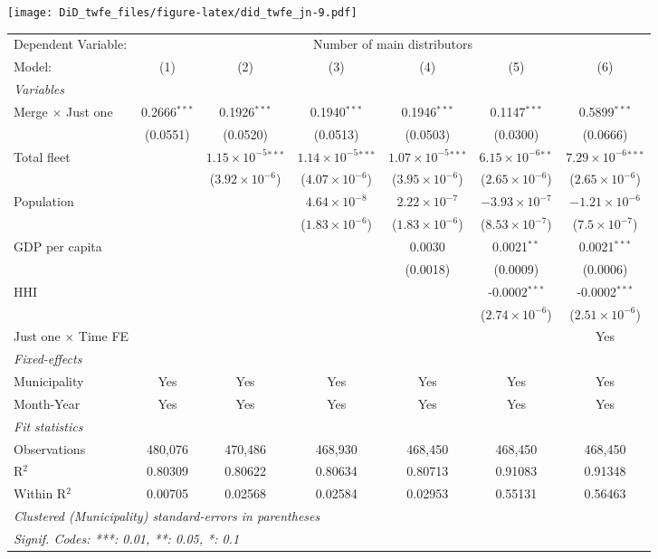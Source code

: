\documentclass[
]{article}
\begin{document}
\texttt{[image: DiD\_twfe\_files/figure-latex/did\_twfe\_jn-9.pdf]}

\begin{tabular}{lcccccc}
\tabularnewline\midrule\midrule
Dependent Variable:&\multicolumn{6}{c}{Number of main distributors}\\
Model:&(1) & (2) & (3) & (4) & (5) & (6)\\
\midrule \emph{Variables}&   &   &   &   &   &  \\
Merge $\times $ Just one & 0.2666$^{***}$ & 0.1926$^{***}$ & 0.1940$^{***}$ & 0.1946$^{***}$ & 0.1147$^{***}$ & 0.5899$^{***}$\\
  &(0.0551) & (0.0520) & (0.0513) & (0.0503) & (0.0300) & (0.0666)\\
Total fleet &    & $1.15\times 10^{-5}$$^{***}$ & $1.14\times 10^{-5}$$^{***}$ & $1.07\times 10^{-5}$$^{***}$ & $6.15\times 10^{-6}$$^{**}$ & $7.29\times 10^{-6}$$^{***}$\\
  &   & ($3.92\times 10^{-6}$) & ($4.07\times 10^{-6}$) & ($3.95\times 10^{-6}$) & ($2.65\times 10^{-6}$) & ($2.65\times 10^{-6}$)\\
Population &    &    & $4.64\times 10^{-8}$ & $2.22\times 10^{-7}$ & $-3.93\times 10^{-7}$ & $-1.21\times 10^{-6}$\\
  &   &    & ($1.83\times 10^{-6}$) & ($1.83\times 10^{-6}$) & ($8.53\times 10^{-7}$) & ($7.5\times 10^{-7}$)\\
GDP per capita &    &    &    & 0.0030 & 0.0021$^{**}$ & 0.0021$^{***}$\\
  &   &    &    & (0.0018) & (0.0009) & (0.0006)\\
HHI &    &    &    &    & -0.0002$^{***}$ & -0.0002$^{***}$\\
  &   &    &    &    & ($2.74\times 10^{-6}$) & ($2.51\times 10^{-6}$)\\
Just one $\times$ Time FE &  &  &  &  &  & Yes\\
\midrule \emph{Fixed-effects}&   &   &   &   &   &  \\
Municipality & Yes & Yes & Yes & Yes & Yes & Yes\\
Month-Year & Yes & Yes & Yes & Yes & Yes & Yes\\
\midrule \emph{Fit statistics}&  & & & & & \\
Observations & 480,076&470,486&468,930&468,450&468,450&468,450\\
R$^2$ & 0.80309&0.80622&0.80634&0.80713&0.91083&0.91348\\
Within R$^2$ & 0.00705&0.02568&0.02584&0.02953&0.55131&0.56463\\
\midrule\midrule\multicolumn{7}{l}{\emph{Clustered (Municipality) standard-errors in parentheses}}\\
\multicolumn{7}{l}{\emph{Signif. Codes: ***: 0.01, **: 0.05, *: 0.1}}\\
\end{tabular}
\end{document}
